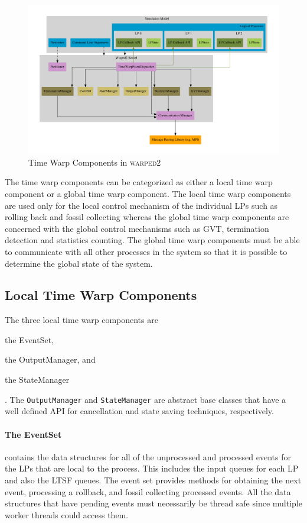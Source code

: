 \documentclass[11pt]{book}
\begin{document}
\begin{figure}[H]
    \centering
    \includegraphics[width=\textwidth,quiet]{figs/graphviz/warped2_overview.pdf}
    \caption{Time Warp Components in \textsc{warped2}}\label{warped2_architecture}
\end{figure}

The time warp components can be categorized as either a local time warp component or a global
time warp component. The local time warp components are used only for the local control
mechanism of the individual LPs such as rolling back and fossil collecting whereas
the global time warp components are concerned with the global control mechanisms such as GVT,
termination detection and statistics counting. The global time warp components must be able to
communicate with all other processes in the system so that it is possible to determine the
global state of the system.

\subsection{Local Time Warp Components}

The three local time warp components are \begin{inparaenum}[(1)] \item the EventSet,
\item the OutputManager, and \item the StateManager\end{inparaenum}. The \texttt{OutputManager} and
\texttt{StateManager} are abstract base classes that have a well defined API for cancellation
and state saving techniques, respectively. 

\paragraph{The EventSet} contains the data structures for all of the unprocessed and
processed events for the LPs that are local to the process. This includes the input queues for
each LP and also the LTSF queues. The event set provides methods for obtaining the next event,
processing a rollback, and fossil collecting processed events. All the data structures that have
pending events must necessarily be thread safe since multiple worker threads could access them.
\end{document}
